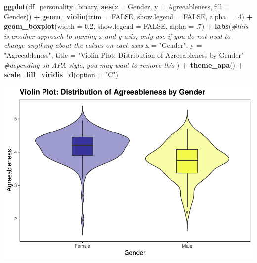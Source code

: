 \documentclass[
]{book}
\newenvironment{Shaded}{\begin{snugshade}}{\end{snugshade}}
\newcommand{\AttributeTok}[1]{\textcolor[rgb]{0.13,0.29,0.53}{#1}}
\newcommand{\CommentTok}[1]{\textcolor[rgb]{0.56,0.35,0.01}{\textit{#1}}}
\newcommand{\ConstantTok}[1]{\textcolor[rgb]{0.56,0.35,0.01}{#1}}
\newcommand{\DecValTok}[1]{\textcolor[rgb]{0.00,0.00,0.81}{#1}}
\newcommand{\FloatTok}[1]{\textcolor[rgb]{0.00,0.00,0.81}{#1}}
\newcommand{\FunctionTok}[1]{\textcolor[rgb]{0.13,0.29,0.53}{\textbf{#1}}}
\newcommand{\NormalTok}[1]{#1}
\newcommand{\SpecialCharTok}[1]{\textcolor[rgb]{0.81,0.36,0.00}{\textbf{#1}}}
\newcommand{\StringTok}[1]{\textcolor[rgb]{0.31,0.60,0.02}{#1}}
\begin{document}
\begin{Shaded}
\begin{Highlighting}[]
\FunctionTok{ggplot}\NormalTok{(df\_personality\_binary, }\FunctionTok{aes}\NormalTok{(}\AttributeTok{x =}\NormalTok{ Gender, }\AttributeTok{y =}\NormalTok{ Agreeableness, }\AttributeTok{fill =}\NormalTok{ Gender)) }\SpecialCharTok{+}
  \FunctionTok{geom\_violin}\NormalTok{(}\AttributeTok{trim =} \ConstantTok{FALSE}\NormalTok{, }
              \AttributeTok{show.legend =} \ConstantTok{FALSE}\NormalTok{, }
              \AttributeTok{alpha =}\NormalTok{ .}\DecValTok{4}\NormalTok{) }\SpecialCharTok{+}
  \FunctionTok{geom\_boxplot}\NormalTok{(}\AttributeTok{width =} \FloatTok{0.2}\NormalTok{, }
               \AttributeTok{show.legend =} \ConstantTok{FALSE}\NormalTok{,}
               \AttributeTok{alpha =}\NormalTok{ .}\DecValTok{7}\NormalTok{) }\SpecialCharTok{+}
  \FunctionTok{labs}\NormalTok{(}\CommentTok{\#this is another approach to naming x and y{-}axis, only use if you do not need to change anything about the values on each axis}
    \AttributeTok{x =} \StringTok{"Gender"}\NormalTok{, }
    \AttributeTok{y =} \StringTok{"Agreeableness"}\NormalTok{,}
    \AttributeTok{title =} \StringTok{"Violin Plot: Distribution of Agreeableness by Gender"} \CommentTok{\#depending on APA style, you may want to remove this}
\NormalTok{  ) }\SpecialCharTok{+}
  \FunctionTok{theme\_apa}\NormalTok{() }\SpecialCharTok{+}
  \FunctionTok{scale\_fill\_viridis\_d}\NormalTok{(}\AttributeTok{option =} \StringTok{"C"}\NormalTok{)}
\end{Highlighting}
\end{Shaded}

\includegraphics{rintro_demo_files/figure-latex/unnamed-chunk-328-1.pdf}
\end{document}
